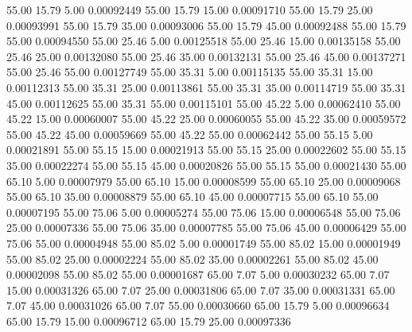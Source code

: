      55.00     15.79      5.00     0.00092449
     55.00     15.79     15.00     0.00091710
     55.00     15.79     25.00     0.00093991
     55.00     15.79     35.00     0.00093006
     55.00     15.79     45.00     0.00092488
     55.00     15.79     55.00     0.00094550
     55.00     25.46      5.00     0.00125518
     55.00     25.46     15.00     0.00135158
     55.00     25.46     25.00     0.00132080
     55.00     25.46     35.00     0.00132131
     55.00     25.46     45.00     0.00137271
     55.00     25.46     55.00     0.00127749
     55.00     35.31      5.00     0.00115135
     55.00     35.31     15.00     0.00112313
     55.00     35.31     25.00     0.00113861
     55.00     35.31     35.00     0.00114719
     55.00     35.31     45.00     0.00112625
     55.00     35.31     55.00     0.00115101
     55.00     45.22      5.00     0.00062410
     55.00     45.22     15.00     0.00060007
     55.00     45.22     25.00     0.00060055
     55.00     45.22     35.00     0.00059572
     55.00     45.22     45.00     0.00059669
     55.00     45.22     55.00     0.00062442
     55.00     55.15      5.00     0.00021891
     55.00     55.15     15.00     0.00021913
     55.00     55.15     25.00     0.00022602
     55.00     55.15     35.00     0.00022274
     55.00     55.15     45.00     0.00020826
     55.00     55.15     55.00     0.00021430
     55.00     65.10      5.00     0.00007979
     55.00     65.10     15.00     0.00008599
     55.00     65.10     25.00     0.00009068
     55.00     65.10     35.00     0.00008879
     55.00     65.10     45.00     0.00007715
     55.00     65.10     55.00     0.00007195
     55.00     75.06      5.00     0.00005274
     55.00     75.06     15.00     0.00006548
     55.00     75.06     25.00     0.00007336
     55.00     75.06     35.00     0.00007785
     55.00     75.06     45.00     0.00006429
     55.00     75.06     55.00     0.00004948
     55.00     85.02      5.00     0.00001749
     55.00     85.02     15.00     0.00001949
     55.00     85.02     25.00     0.00002224
     55.00     85.02     35.00     0.00002261
     55.00     85.02     45.00     0.00002098
     55.00     85.02     55.00     0.00001687
     65.00      7.07      5.00     0.00030232
     65.00      7.07     15.00     0.00031326
     65.00      7.07     25.00     0.00031806
     65.00      7.07     35.00     0.00031331
     65.00      7.07     45.00     0.00031026
     65.00      7.07     55.00     0.00030660
     65.00     15.79      5.00     0.00096634
     65.00     15.79     15.00     0.00096712
     65.00     15.79     25.00     0.00097336

